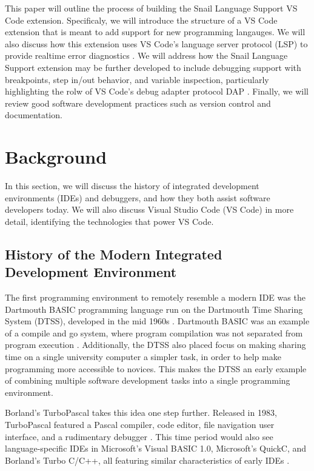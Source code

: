 \documentclass{article}
\begin{document}
This paper will outline the process of building the Snail Language Support VS Code extension. Specificaly, we will introduce the structure of a VS Code extension that is meant to add support for new programming langauges. We will also discuss how this extension uses VS Code's language server protocol (LSP) to provide realtime error diagnostics \cite{Microsoft_2022a}. We will address how the Snail Language Support extension may be further developed to include debugging support with breakpoints, step in/out behavior, and variable inspection, particularly highlighting the rolw of VS Code's debug adapter protocol DAP \cite{Microsoft_2021}. Finally, we will review good software development practices such as version control and documentation. 

\section{Background}

In this section, we will discuss the history of integrated development environments (IDEs) and debuggers, and how they both assist software developers today. We will also discuss Visual Studio Code (VS Code) in more detail, identifying the technologies that power VS Code. 

\subsection{History of the Modern Integrated Development Environment}

The first programming environment to remotely resemble a modern IDE was the Dartmouth BASIC programming language run on the Dartmouth Time Sharing System (DTSS), developed in the mid 1960s \cite{KemenyKurtz_1968, Kurtz_1978}. Dartmouth BASIC was an example of a compile and go system, where program compilation was not separated from program execution \cite{Weik_2001}. Additionally, the DTSS also placed focus on making sharing time on a single university computer a simpler task, in order to help make programming more accessible to novices. This makes the DTSS an early example of combining multiple software development tasks into a single programming environment.

Borland's TurboPascal takes this idea one step further. Released in 1983, TurboPascal featured a Pascal compiler, code editor, file navigation user interface, and a rudimentary debugger \cite{Gajic_2017, Intersimone_2010, Wadlow_1984}. This time period would also see language-specific IDEs in Microsoft's Visual BASIC 1.0, Microsoft's QuickC, and Borland's Turbo C/C++, all featuring similar characteristics of early IDEs \cite{Burgwin_2013, Plant_Murrell_2007, Posch_2023, Forer_Petreley_1991}.
\end{document}
